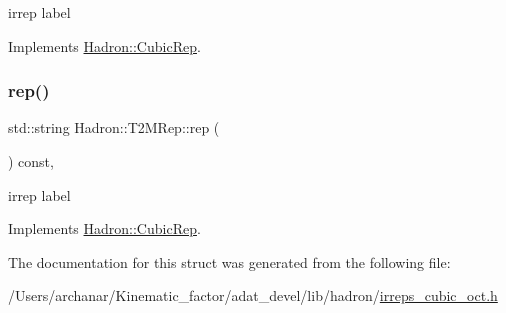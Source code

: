 irrep label 

Implements \mbox{\hyperlink{structHadron_1_1CubicRep_ac3eb63608803d44c68681f158e14eb1b}{Hadron\+::\+Cubic\+Rep}}.

\mbox{\label{structHadron_1_1T2MRep_aa55b94a93f3336ef06369b8e2d544160}} 
\subsubsection{\texorpdfstring{rep()}{rep()}\hspace{0.1cm}{\footnotesize\ttfamily [2/2]}}
{\footnotesize\ttfamily std\+::string Hadron\+::\+T2\+M\+Rep\+::rep (\begin{DoxyParamCaption}{ }\end{DoxyParamCaption}) const\hspace{0.3cm}{\ttfamily [inline]}, {\ttfamily [virtual]}}

irrep label 

Implements \mbox{\hyperlink{structHadron_1_1CubicRep_ac3eb63608803d44c68681f158e14eb1b}{Hadron\+::\+Cubic\+Rep}}.



The documentation for this struct was generated from the following file\+:\begin{DoxyCompactItemize}
\item 
/\+Users/archanar/\+Kinematic\+\_\+factor/adat\+\_\+devel/lib/hadron/\mbox{\hyperlink{lib_2hadron_2irreps__cubic__oct_8h}{irreps\+\_\+cubic\+\_\+oct.\+h}}\end{DoxyCompactItemize}
